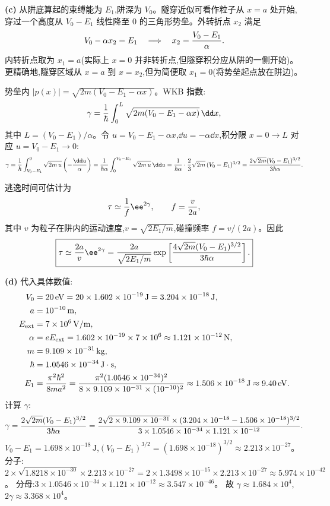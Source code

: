 \begin{question}
\begin{solution}
\textbf{(c)} 从阱底算起的束缚能为 $E_1$,阱深为 $V_0$。隧穿近似可看作粒子从 $x=a$ 处开始,穿过一个高度从 $V_0-E_1$ 线性降至 $0$ 的三角形势垒。外转折点 $x_2$ 满足
\[
V_0-\alpha x_2 = E_1 \quad\Longrightarrow\quad
x_2 = {V_0-E_1\over\alpha}.
\]
内转折点取为 $x_1=a$(实际上 $x=0$ 并非转折点,但隧穿积分应从阱的一侧开始)。更精确地,隧穿区域从 $x=a$ 到 $x=x_2$,但为简便取 $x_1=0$(将势垒起点放在阱边)。

势垒内 $|p(x)|=\sqrt{2m(V_0-E_1-\alpha x)}$。WKB 指数:
\[
\gamma={1\over\hbar}\int_0^{L}\sqrt{2m(V_0-E_1-\alpha x)}\,\dd x,
\]
其中 $L=(V_0-E_1)/\alpha$。令 $u=V_0-E_1-\alpha x$,$\dd u=-\alpha\dd x$,积分限 $x=0\to L$ 对应 $u=V_0-E_1\to 0$:
\[
\gamma={1\over\hbar}\int_{V_0-E_1}^{0}\sqrt{2m\,u}\left(-{\dd u\over\alpha}\right)
={1\over\hbar\alpha}\int_0^{V_0-E_1}\sqrt{2m\,u}\,\dd u
={1\over\hbar\alpha}\cdot{2\over3}\sqrt{2m}\,(V_0-E_1)^{3/2}
={2\sqrt{2m}(V_0-E_1)^{3/2}\over3\hbar\alpha}.
\]

逃逸时间可估计为
\[
\tau\simeq {1\over f}\ee^{2\gamma},\qquad f={v\over 2a},
\]
其中 $v$ 为粒子在阱内的运动速度,$v=\sqrt{2E_1/m}$,碰撞频率 $f=v/(2a)$。因此
\[
\boxed{\tau\simeq {2a\over v}\ee^{2\gamma}
={2a\over\sqrt{2E_1/m}}\exp\left[{4\sqrt{2m}(V_0-E_1)^{3/2}\over3\hbar\alpha}\right].}
\]

\textbf{(d)} 代入具体数值:
\begin{align*}
V_0 &= 20\,\mathrm{eV}=20\times1.602\times10^{-19}\,\mathrm{J}=3.204\times10^{-18}\,\mathrm{J},\\
a &= 10^{-10}\,\mathrm{m},\\
E_{\rm ext} &= 7\times10^6\,\mathrm{V/m},\\
\alpha &= eE_{\rm ext}=1.602\times10^{-19}\times7\times10^6\approx1.121\times10^{-12}\,\mathrm{N},\\
m &= 9.109\times10^{-31}\,\mathrm{kg},\\
\hbar &= 1.0546\times10^{-34}\,\mathrm{J\cdot s},\\
E_1 &= {\pi^2\hbar^2\over8ma^2}
={\pi^2(1.0546\times10^{-34})^2\over8\times9.109\times10^{-31}\times(10^{-10})^2}
\approx 1.506\times10^{-18}\,\mathrm{J}\approx 9.40\,\mathrm{eV}.
\end{align*}
计算 $\gamma$:
\[
\gamma={2\sqrt{2m}(V_0-E_1)^{3/2}\over3\hbar\alpha}
={2\sqrt{2\times9.109\times10^{-31}}\times(3.204\times10^{-18}-1.506\times10^{-18})^{3/2}
\over3\times1.0546\times10^{-34}\times1.121\times10^{-12}}.
\]
$V_0-E_1=1.698\times10^{-18}\,\mathrm{J}$,$(V_0-E_1)^{3/2}=(1.698\times10^{-18})^{3/2}\approx2.213\times10^{-27}$。
分子:$2\times\sqrt{1.8218\times10^{-30}}\times2.213\times10^{-27}
=2\times1.3498\times10^{-15}\times2.213\times10^{-27}\approx5.974\times10^{-42}$。
分母:$3\times1.0546\times10^{-34}\times1.121\times10^{-12}\approx3.547\times10^{-46}$。
故 $\gamma\approx1.684\times10^4$,$2\gamma\approx3.368\times10^4$。


\end{solution}
\end{question}
